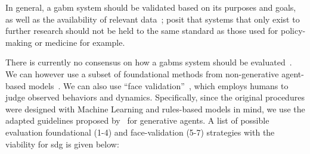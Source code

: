 In general, a \ac{gabm} system should be validated based on its purposes and goals, as well as the availability of relevant data~\cite{collins2024}; \cite{adornetto2025_gabms} posit that systems that only exist to further research should not be held to the same standard as those used for policy-making or medicine for example.

There is currently no consensus on how a \acp{gabm} system should be evaluated~\cite{adornetto2025_gabms}. We can however use a subset of foundational methods from non-generative agent-based models~\cite{collins2024}. We can also use ``face validation''~\cite{rand2011_rigor}, which employs humans to judge observed behaviors and dynamics. Specifically, since the original procedures were designed with Machine Learning and rules-based models in mind, we use the adapted guidelines proposed by~\cite{adornetto2025_gabms} for generative agents. A list of possible evaluation foundational (1-4) and face-validation (5-7) strategies with the viability for \ac{sdg} is given below:

